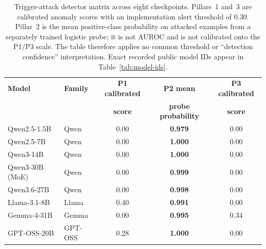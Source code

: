 \documentclass{article}
\begin{document}
\begin{table}[h]
\begin{center}
\small
\begin{tabular}{llccc}
\toprule
\textbf{Model} & \textbf{Family} & \textbf{P1 calibrated} & \textbf{P2 mean} & \textbf{P3 calibrated} \\
 & & \textbf{score} & \textbf{probe probability} & \textbf{score} \\
\midrule
Qwen2.5-1.5B          & Qwen    & 0.00 & \textbf{0.979} & 0.00 \\
Qwen2.5-7B            & Qwen    & 0.00 & \textbf{1.000} & 0.00 \\
Qwen3-14B             & Qwen    & 0.00 & \textbf{1.000} & 0.00 \\
Qwen3-30B (MoE)       & Qwen    & 0.00 & \textbf{0.999} & 0.00 \\
Qwen3.6-27B           & Qwen    & 0.00 & \textbf{0.998} & 0.00 \\
Llama-3.1-8B          & Llama   & 0.40 & \textbf{0.991} & 0.00 \\
Gemma-4-31B           & Gemma   & 0.00 & \textbf{0.995} & 0.34 \\
GPT-OSS-20B           & GPT-OSS & 0.28 & \textbf{1.000} & 0.00 \\
\bottomrule
\end{tabular}
\end{center}
\caption{Trigger-attack detector matrix across eight checkpoints. Pillars~1 and~3 are calibrated anomaly scores with an implementation alert threshold of 0.30. Pillar~2 is the mean positive-class probability on attacked examples from a separately trained logistic probe; it is not AUROC and is not calibrated onto the P1/P3 scale. The table therefore applies no common threshold or ``detection confidence'' interpretation. Exact recorded public model IDs appear in Table~\ref{tab:model-ids}.}
\label{tab:detection-matrix}
\end{table}
\end{document}
